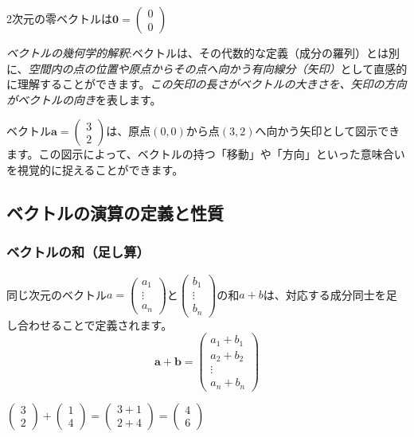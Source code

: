 \begin{ex}
2次元の零ベクトルは$\bm{0} = \begin{pmatrix} 0 \\ 0 \end{pmatrix}$
\end{ex}
\emph{ベクトルの幾何学的解釈}:ベクトルは、その代数的な定義（成分の羅列）とは別に、\emph{空間内の点の位置や原点からその点へ向かう有向線分（矢印）}として直感的に理解することができます。\emph{この矢印の長さがベクトルの大きさを、矢印の方向がベクトルの向き}を表します。
\begin{ex}
ベクトル$\bm{a} = \begin{pmatrix} 3 \\ 2 \end{pmatrix}$は、原点$(0,0)$から点$(3,2)$へ向かう矢印として図示できます。この図示によって、ベクトルの持つ「移動」や「方向」といった意味合いを視覚的に捉えることができます。
\end{ex}

\subsection{ベクトルの演算の定義と性質}
\subsubsection{ベクトルの和（足し算）}
\begin{dfn}[ベクトルの和]
同じ次元のベクトル$a=\begin{pmatrix} a_1 \\ \vdots \\ a_n \end{pmatrix}$と$\begin{pmatrix} b_1 \\ \vdots \\ b_n \end{pmatrix}$の和$a+b$は、対応する成分同士を足し合わせることで定義されます。
\[\bm{a} + \bm{b} = \begin{pmatrix} a_1 + b_1 \\ a_2 + b_2 \\ \vdots \\ a_n + b_n \end{pmatrix}\]
\end{dfn}
\begin{ex}
$\begin{pmatrix} 3 \\ 2 \end{pmatrix} + \begin{pmatrix} 1 \\ 4 \end{pmatrix} = \begin{pmatrix} 3 + 1 \\ 2 + 4 \end{pmatrix} = \begin{pmatrix} 4 \\ 6 \end{pmatrix}$
\end{ex}

